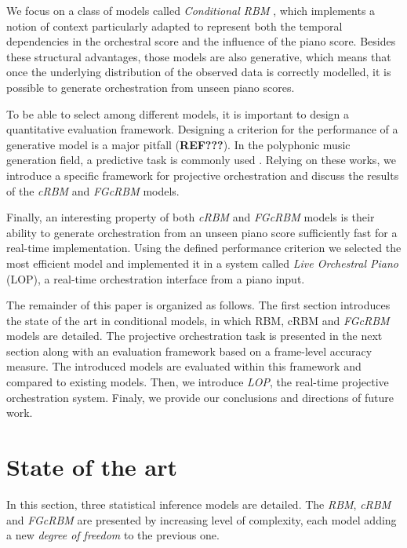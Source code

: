 \documentclass[letterpaper]{article}
\begin{document}
We focus on a class of models called \textit{Conditional RBM} \cite{taylor2006modeling}, which implements a notion of context particularly adapted to represent both the temporal dependencies in the orchestral score and the influence of the piano score.
Besides these structural advantages, those models are also generative, which means that once the underlying distribution of the observed data is correctly modelled, it is possible to generate orchestration from unseen piano scores.

To be able to select among different models, it is important to design a quantitative evaluation framework. Designing a criterion for the performance of a generative model is a major pitfall (\textbf{REF???}). In the polyphonic music generation field, a predictive task is commonly used \cite{DBLP:journals/corr/YaoCVDD15,boulanger2012modeling,lavrenko2003polyphonic}. Relying on these works, we introduce a specific framework for projective orchestration and discuss the results of the \textit{cRBM} and \textit{FGcRBM} models.

Finally, an interesting property of both \textit{cRBM} and \textit{FGcRBM} models is their ability to generate orchestration from an unseen piano score sufficiently fast for a real-time implementation.
Using the defined performance criterion we selected the most efficient model and implemented it in a system called \textit{Live Orchestral Piano} (LOP), a real-time orchestration interface from a piano input.

The remainder of this paper is organized as follows. The first section introduces the state of the art in conditional models, in which RBM, cRBM and \textit{FGcRBM} models are detailed. The projective orchestration task is presented in the next section along with an evaluation framework based on a frame-level accuracy measure. The introduced models are evaluated within this framework and compared to existing models. Then, we introduce \textit{LOP}, the real-time projective orchestration system. Finaly, we provide our conclusions and directions of future work.

\section{State of the art}
\label{sec:state_of_the_art}
In this section, three statistical inference models are detailed. The \textit{RBM}, \textit{cRBM} and \textit{FGcRBM} are presented by increasing level of complexity, each model adding a new \textit{degree of freedom} to the previous one.
\end{document}
